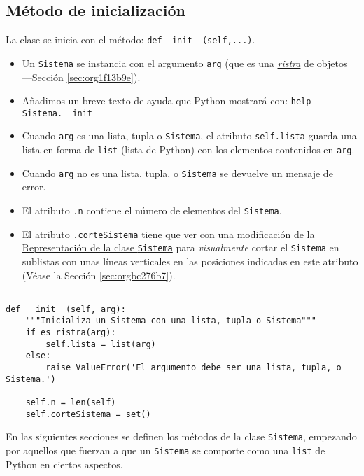 \documentclass[11pt]{report}
\begin{document}
\subsection{Método de inicialización}
\label{sec:org53bf0bf}

La clase se inicia con el método: \texttt{def\_\_init\_\_(self,...)}.

\begin{itemize}
\item Un \texttt{Sistema} se instancia con el argumento \texttt{arg} (que es una \hyperref[sec:org1f13b9e]{\emph{ristra}} de objetos ---Sección
\ref{sec:org1f13b9e}).

\item Añadimos un breve texto de ayuda que Python mostrará con: \texttt{help Sistema.\_\_init\_\_}

\item Cuando \texttt{arg} es una lista, tupla o \texttt{Sistema}, el atributo \texttt{self.lista} guarda una lista en forma
de \texttt{list} (lista de Python) con los elementos contenidos en \texttt{arg}.

\item Cuando \texttt{arg} no es una lista, tupla, o \texttt{Sistema} se devuelve un mensaje de error.

\item El atributo \texttt{.n} contiene el número de elementos del \texttt{Sistema}.

\item El atributo \texttt{.corteSistema} tiene que ver con una modificación de la \hyperref[sec:orgbc276b7]{Representación de la clase
\texttt{Sistema}} para \emph{visualmente} cortar el \texttt{Sistema} en sublistas con unas líneas verticales en las
posiciones indicadas en este atributo (Véase la Sección \ref{sec:orgbc276b7}).
\end{itemize}

\begin{verbatim}

def __init__(self, arg):
    """Inicializa un Sistema con una lista, tupla o Sistema"""
    if es_ristra(arg):
        self.lista = list(arg)
    else:
        raise ValueError('El argumento debe ser una lista, tupla, o Sistema.')
    
    self.n = len(self)
    self.corteSistema = set()

\end{verbatim}

En las siguientes secciones se definen los métodos de la clase \texttt{Sistema}, empezando por aquellos que
fuerzan a que un \texttt{Sistema} se comporte como una \texttt{list} de Python en ciertos aspectos.
\end{document}
